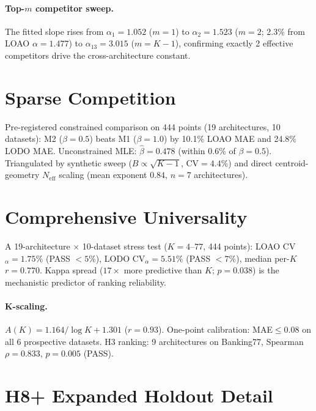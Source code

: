 \documentclass{article}
\begin{document}
\paragraph{Top-$m$ competitor sweep.}
The fitted slope rises from $\alpha_1=1.052$ ($m=1$) to $\alpha_2=1.523$ ($m=2$; 2.3\% from LOAO $\alpha=1.477$) to $\alpha_{13}=3.015$ ($m=K-1$), confirming exactly 2 effective competitors drive the cross-architecture constant.

\section{Sparse Competition}
\label{app:sparse-competition}

Pre-registered constrained comparison on 444 points (19 architectures, 10 datasets): M2 ($\beta=0.5$) beats M1 ($\beta=1.0$) by 10.1\% LOAO MAE and 24.8\% LODO MAE. Unconstrained MLE: $\hat\beta=0.478$ (within 0.6\% of $\beta=0.5$). Triangulated by synthetic sweep ($B\propto\sqrt{K-1}$, CV$=4.4\%$) and direct centroid-geometry $N_\mathrm{eff}$ scaling (mean exponent $0.84$, $n=7$ architectures).

\section{Comprehensive Universality}
\label{app:comprehensive}
A 19-architecture $\times$ 10-dataset stress test ($K=4$--$77$, 444 points): LOAO CV$_\alpha=1.75\%$ (PASS $<5\%$), LODO CV$_\alpha=5.51\%$ (PASS $<7\%$), median per-$K$ $r=0.770$. Kappa spread ($17\times$ more predictive than $K$; $p=0.038$) is the mechanistic predictor of ranking reliability.

\paragraph{K-scaling.}
$A(K)=1.164/\log K+1.301$ ($r=0.93$). One-point calibration: MAE$\leq$0.08 on all 6 prospective datasets. H3 ranking: 9 architectures on Banking77, Spearman $\rho=0.833$, $p=0.005$ (PASS).

\section{H8+ Expanded Holdout Detail}
\label{subsec:h8plus-detail}
\end{document}
